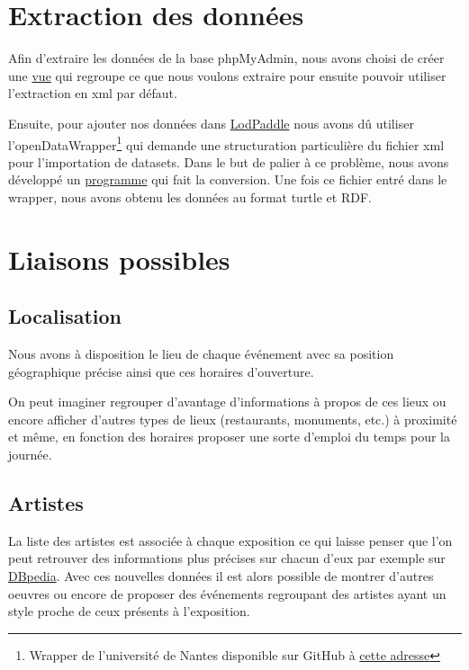 \documentclass[12pt,a4paper]{article}
\begin{document}
	\section{Extraction des données}	
	Afin d'extraire les données de la base phpMyAdmin, nous avons choisi de créer une \href{http://github.com/masterALMA2016/DataLeReacteur/blob/master/extract/views.sql}{vue} qui regroupe ce que nous voulons extraire pour ensuite pouvoir utiliser l'extraction en xml par défaut. 
	
	
	Ensuite, pour ajouter nos données dans \href{http://lodpaddle.univ-nantes.fr/lodpaddle}{LodPaddle} nous avons dû utiliser l'openDataWrapper\footnote{Wrapper de l'université de Nantes disponible sur GitHub à \href{http://github.com/masterALMA2016/openDataWrapper}{cette adresse}} qui demande une structuration particulière du fichier xml pour l'importation de datasets. Dans le but de palier à ce problème, nous avons développé un \href{http://github.com/masterALMA2016/DataLeReacteur/blob/master/extract/Pma2xml.java}{programme} qui fait la conversion. Une fois ce fichier entré dans le wrapper, nous avons obtenu les données au format turtle et RDF.
	
	\section{Liaisons possibles}
	\subsection{Localisation}
	Nous avons à disposition le lieu de chaque événement avec sa position géographique précise ainsi que ces horaires d'ouverture. 
	
On peut imaginer regrouper d'avantage d'informations à propos de ces lieux ou encore afficher d'autres types de lieux (restaurants, monuments, etc.) à proximité et même, en fonction des horaires proposer une sorte d'emploi du temps pour la journée.
	\subsection{Artistes}
	La liste des artistes est associée à chaque exposition ce qui laisse penser que l'on peut retrouver des informations plus précises sur chacun d'eux par exemple sur \href{http://dbpedia.org}{DBpedia}. Avec ces nouvelles données il est alors possible de montrer d'autres oeuvres ou encore de proposer des événements regroupant des artistes ayant un style proche de ceux présents à l'exposition.
	
\end{document}
